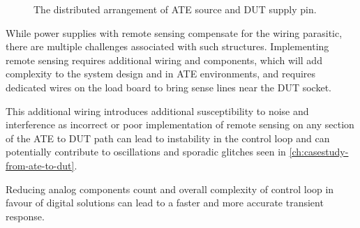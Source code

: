 \begin{figure}[htbp]
    \centering
    \caption[Comparison of Sensing Arrangements in Supplies]{
        The distributed arrangement of ATE source and DUT supply pin.
    }
    \label{fig:distributed-arrangement-ate-supply}
\end{figure}

While power supplies with remote sensing compensate for the wiring parasitic,
there are multiple challenges associated with such structures.
Implementing remote sensing requires additional wiring and components,
which will add complexity to the system design and in \ac{ATE} environments, and
requires dedicated wires on the load board to bring sense lines near the
\ac{DUT} socket.

This additional wiring introduces additional
susceptibility to noise and interference as incorrect or poor implementation of
remote sensing on any section of the \ac{ATE} to \ac{DUT} path can lead to
instability in the control loop and can potentially contribute to oscillations
and sporadic glitches seen in \autoref{ch:casestudy-from-ate-to-dut}.

Reducing analog components count and overall complexity of control loop in
favour of digital solutions can lead to a faster and more accurate transient
response.




